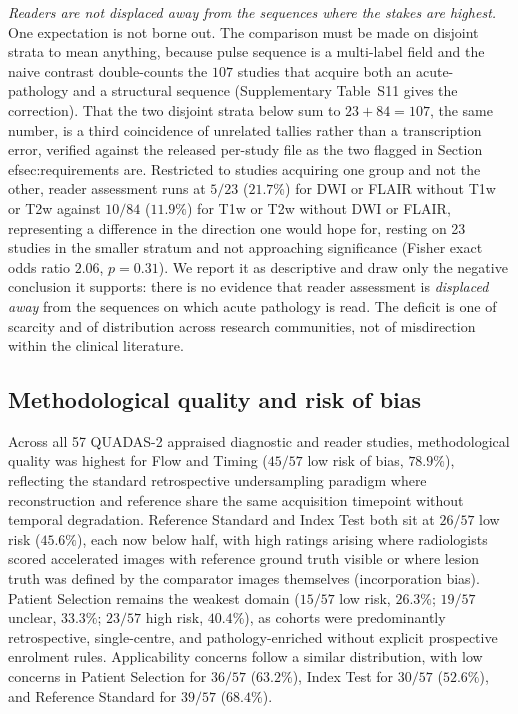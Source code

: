 \documentclass[review,authoryear]{elsarticle}
\begin{document}
\emph{Readers are not displaced away from the sequences where the stakes are highest.}
One expectation is not borne out. The comparison must be made on disjoint strata to mean
anything, because pulse sequence is a multi-label field and the naive contrast
double-counts the $107$ studies that acquire both an acute-pathology and a structural
sequence (Supplementary Table~S11 gives the correction). That the two disjoint strata below sum to $23+84=107$, the same number, is a third coincidence of unrelated tallies rather than a transcription error, verified against the released per-study file as the two flagged in Section~
ef{sec:requirements} are. Restricted to studies acquiring
one group and not the other, reader assessment runs at $5/23$ ($21.7\%$) for DWI or
FLAIR without T1w or T2w against $10/84$ ($11.9\%$) for T1w or T2w without DWI or FLAIR, representing a difference in the direction one would hope for, resting on 23 studies in the
smaller stratum and not approaching significance (Fisher exact odds ratio $2.06$,
$p=0.31$). We report it as descriptive and draw only the negative conclusion it
supports: there is no evidence that reader assessment is \emph{displaced away} from the
sequences on which acute pathology is read. The deficit is one of scarcity and of
distribution across research communities, not of misdirection within the clinical
literature.

\subsection{Methodological quality and risk of bias}
Across all 57 QUADAS-2 appraised diagnostic and reader studies, methodological quality was highest for Flow and Timing ($45/57$ low risk of bias, $78.9\%$), reflecting the standard retrospective undersampling paradigm where reconstruction and reference share the same acquisition timepoint without temporal degradation. Reference Standard and Index Test both sit at $26/57$ low risk ($45.6\%$), each now below half, with high ratings arising where radiologists scored accelerated images with reference ground truth visible or where lesion truth was defined by the comparator images themselves (incorporation bias). Patient Selection remains the weakest domain ($15/57$ low risk, $26.3\%$; $19/57$ unclear, $33.3\%$; $23/57$ high risk, $40.4\%$), as cohorts were predominantly retrospective, single-centre, and pathology-enriched without explicit prospective enrolment rules. Applicability concerns follow a similar distribution, with low concerns in Patient Selection for $36/57$ ($63.2\%$), Index Test for $30/57$ ($52.6\%$), and Reference Standard for $39/57$ ($68.4\%$).
\end{document}
